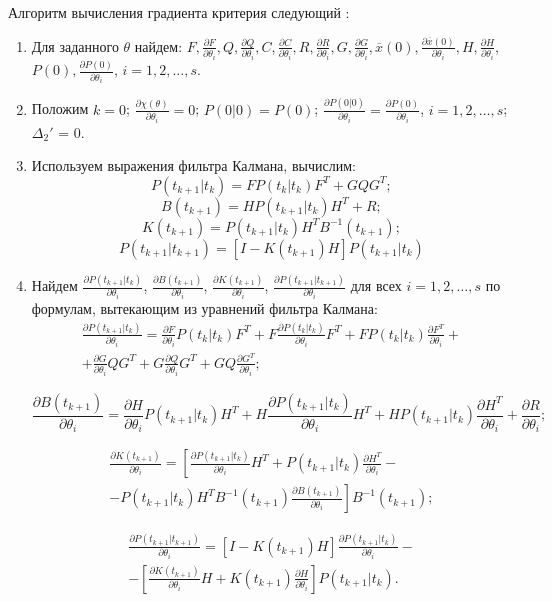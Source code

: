 \documentclass[a4paper,14pt]{extarticle}
\newcommand{\pred}[0]{t_{k+1}|t_k}
\newcommand{\fut}[0]{t_{k+1}}
\newcommand{\estfut}[0]{t_{k+1}|t_{k+1}}
\newcommand{\pd}[2]{\frac{\partial #1}{\partial #2}}
\newcommand{\pdpk}[1]{\pd{#1}{\theta_i}}
\newcommand{\inv}[1]{#1^{-1}}
\begin{document}
Алгоритм вычисления градиента критерия следующий \cite{mono}:
\begin{enumerate}
\item Для заданного $\theta$ найдем: $F, \pd{F}{\theta_i}, Q, \pd{Q}{\theta_i},
C, \pd{C}{\theta_i}, R, \pd{R}{\theta_i}, G, \pd{G}{\theta_i}, \overline{x}(0),
\pd{\overline{x}(0)}{\theta_i}, H, \pd{H}{\theta_i}$, $P(0),
\pd{P(0)}{\theta_i}$, $i = 1, 2, \ldots, s$. 

\item Положим $k = 0$; $\pd{\chi(\theta)}{\theta_i} = 0$; $P(0|0) = P(0)$;
$\pd{P(0|0)}{\theta_i} = \pd{P(0)}{\theta_i}$, $i = 1, 2, \ldots, s$;
$\Delta_2'$ = 0.

\item Используем выражения фильтра Калмана, вычислим:
\[
	P(t_{k+1}|t_k) = F P(t_k|t_k) F^T + GQG^T;
\]
\[
	B(t_{k+1}) = H P(t_{k+1}|t_k) H^T + R;
\]
\[
	K(t_{k+1}) = P(t_{k+1}|t_k) H^T B^{-1}(t_{k+1});
\]
\[
	P(t_{k+1}|t_{k+1}) = \left[ I - K(t_{k+1}) H \right] P(t_{k+1}|t_k)
\]
\item Найдем $\pd{P(t_{k+1}|t_k)}{\theta_i}$, $\pd{B(t_{k+1})}{\theta_i}$,
$\pd{K(t_{k+1})}{\theta_i}$, $\pd{P(t_{k+1}|t_{k+1})}{\theta_i}$ для всех
$i = 1, 2, \ldots, s$ по формулам, вытекающим из уравнений фильтра Калмана:
\begin{equation*}
\begin{split}
	\pd{P(t_{k+1}|t_k)}{\theta_i} = \pd{F}{\theta_i} P(t_k|t_k) F^T + F
	\pd{P(t_k|t_k)}{\theta_i} F^T + F P(t_k|t_k) \pd{F^T}{\theta_i} + \\ +
	\pd{G}{\theta_i} Q G^T + G \pd{Q}{\theta_i} G^T + G Q \pd{G^T}{\theta_i};
\end{split}
\end{equation*}



\[
	\pdpk{B(t_{k+1})} = \pdpk{H} P(t_{k+1}|t_k) H^T + H \pdpk{P(\pred)} H^T +
	H P(\pred) \pdpk{H^T} + \pdpk{R}; 
\]


\begin{equation*}
\begin{split}
	\pdpk{K(\fut)} = \left[ \pdpk{P(\pred)} H^T + P(\pred) \pdpk{H^T} - \right.
	\\ \left. -
	P(\pred) H^T \inv{B}(\fut) \pdpk{B(\fut)} \right] \inv{B}(\fut); \end{split}
\end{equation*}

\begin{equation*}
\begin{split}
	\pdpk{P(\estfut)} = \left[ I - K(\fut) H \right] \pdpk{P(\pred)} - \\ -
	\left[ \pdpk{K(\fut)} H + K(\fut) \pdpk{H} \right] P(\pred).
\end{split}
\end{equation*}


\end{enumerate}
\end{document}
